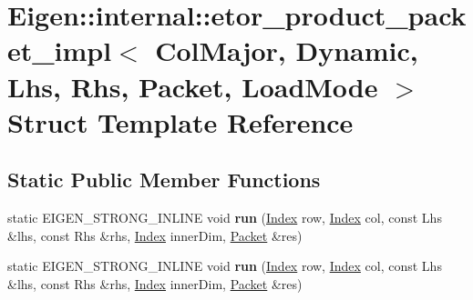 \hypertarget{struct_eigen_1_1internal_1_1etor__product__packet__impl_3_01_col_major_00_01_dynamic_00_01_lhs_01a60bbe1c1e9b0010fd66b16dd91f8f7}{}\section{Eigen\+:\+:internal\+:\+:etor\+\_\+product\+\_\+packet\+\_\+impl$<$ Col\+Major, Dynamic, Lhs, Rhs, Packet, Load\+Mode $>$ Struct Template Reference}
\label{struct_eigen_1_1internal_1_1etor__product__packet__impl_3_01_col_major_00_01_dynamic_00_01_lhs_01a60bbe1c1e9b0010fd66b16dd91f8f7}
\subsection*{Static Public Member Functions}
\begin{DoxyCompactItemize}
\item 
\mbox{\label{struct_eigen_1_1internal_1_1etor__product__packet__impl_3_01_col_major_00_01_dynamic_00_01_lhs_01a60bbe1c1e9b0010fd66b16dd91f8f7_ae9cb59070b643196c487aa384b2132d5}} 
static E\+I\+G\+E\+N\+\_\+\+S\+T\+R\+O\+N\+G\+\_\+\+I\+N\+L\+I\+NE void {\bfseries run} (\hyperlink{namespace_eigen_a62e77e0933482dafde8fe197d9a2cfde}{Index} row, \hyperlink{namespace_eigen_a62e77e0933482dafde8fe197d9a2cfde}{Index} col, const Lhs \&lhs, const Rhs \&rhs, \hyperlink{namespace_eigen_a62e77e0933482dafde8fe197d9a2cfde}{Index} inner\+Dim, \hyperlink{union_eigen_1_1internal_1_1_packet}{Packet} \&res)
\item 
\mbox{\label{struct_eigen_1_1internal_1_1etor__product__packet__impl_3_01_col_major_00_01_dynamic_00_01_lhs_01a60bbe1c1e9b0010fd66b16dd91f8f7_ae9cb59070b643196c487aa384b2132d5}} 
static E\+I\+G\+E\+N\+\_\+\+S\+T\+R\+O\+N\+G\+\_\+\+I\+N\+L\+I\+NE void {\bfseries run} (\hyperlink{namespace_eigen_a62e77e0933482dafde8fe197d9a2cfde}{Index} row, \hyperlink{namespace_eigen_a62e77e0933482dafde8fe197d9a2cfde}{Index} col, const Lhs \&lhs, const Rhs \&rhs, \hyperlink{namespace_eigen_a62e77e0933482dafde8fe197d9a2cfde}{Index} inner\+Dim, \hyperlink{union_eigen_1_1internal_1_1_packet}{Packet} \&res)
\end{DoxyCompactItemize}


